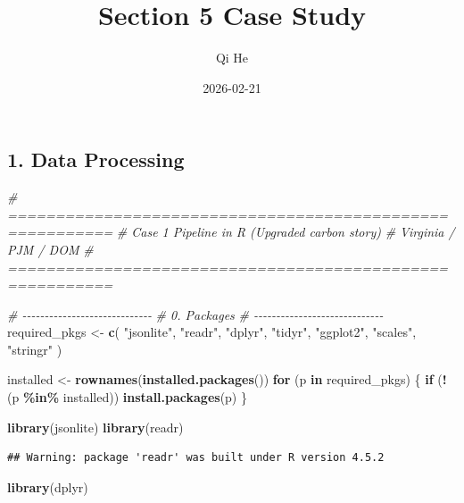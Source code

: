 \documentclass[
]{article}
\title{Section 5 Case Study}
\author{Qi He}
\date{2026-02-21}
\newenvironment{Shaded}{\begin{snugshade}}{\end{snugshade}}
\newcommand{\CommentTok}[1]{\textcolor[rgb]{0.56,0.35,0.01}{\textit{#1}}}
\newcommand{\ControlFlowTok}[1]{\textcolor[rgb]{0.13,0.29,0.53}{\textbf{#1}}}
\newcommand{\FunctionTok}[1]{\textcolor[rgb]{0.13,0.29,0.53}{\textbf{#1}}}
\newcommand{\NormalTok}[1]{#1}
\newcommand{\OtherTok}[1]{\textcolor[rgb]{0.56,0.35,0.01}{#1}}
\newcommand{\SpecialCharTok}[1]{\textcolor[rgb]{0.81,0.36,0.00}{\textbf{#1}}}
\newcommand{\StringTok}[1]{\textcolor[rgb]{0.31,0.60,0.02}{#1}}
\begin{document}
\maketitle

\subsection{1. Data Processing}\label{data-processing}

\begin{Shaded}
\begin{Highlighting}[]
\CommentTok{\# =========================================================}
\CommentTok{\# Case 1 Pipeline in R (Upgraded carbon story)}
\CommentTok{\# Virginia / PJM / DOM}
\CommentTok{\# =========================================================}

\CommentTok{\# {-}{-}{-}{-}{-}{-}{-}{-}{-}{-}{-}{-}{-}{-}{-}{-}{-}{-}{-}{-}{-}{-}{-}{-}{-}{-}{-}{-}{-}}
\CommentTok{\# 0. Packages}
\CommentTok{\# {-}{-}{-}{-}{-}{-}{-}{-}{-}{-}{-}{-}{-}{-}{-}{-}{-}{-}{-}{-}{-}{-}{-}{-}{-}{-}{-}{-}{-}}
\NormalTok{required\_pkgs }\OtherTok{\textless{}{-}} \FunctionTok{c}\NormalTok{(}
  \StringTok{"jsonlite"}\NormalTok{, }\StringTok{"readr"}\NormalTok{, }\StringTok{"dplyr"}\NormalTok{, }\StringTok{"tidyr"}\NormalTok{, }\StringTok{"ggplot2"}\NormalTok{, }\StringTok{"scales"}\NormalTok{, }\StringTok{"stringr"}
\NormalTok{)}

\NormalTok{installed }\OtherTok{\textless{}{-}} \FunctionTok{rownames}\NormalTok{(}\FunctionTok{installed.packages}\NormalTok{())}
\ControlFlowTok{for}\NormalTok{ (p }\ControlFlowTok{in}\NormalTok{ required\_pkgs) \{}
  \ControlFlowTok{if}\NormalTok{ (}\SpecialCharTok{!}\NormalTok{(p }\SpecialCharTok{\%in\%}\NormalTok{ installed)) }\FunctionTok{install.packages}\NormalTok{(p)}
\NormalTok{\}}

\FunctionTok{library}\NormalTok{(jsonlite)}
\FunctionTok{library}\NormalTok{(readr)}
\end{Highlighting}
\end{Shaded}

\begin{verbatim}
## Warning: package 'readr' was built under R version 4.5.2
\end{verbatim}

\begin{Shaded}
\begin{Highlighting}[]
\FunctionTok{library}\NormalTok{(dplyr)}
\end{Highlighting}
\end{Shaded}
\end{document}

